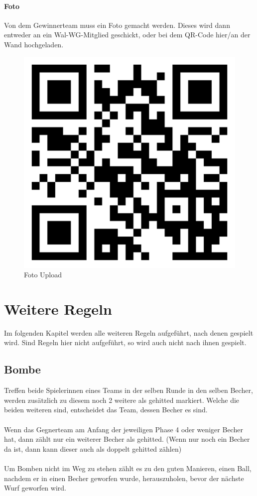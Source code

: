 \documentclass[a5paper, 12pt]{book}
\begin{document}
\subsubsection{Foto}\label{subsub:foto}
Von dem Gewinnerteam muss ein Foto gemacht werden. Dieses wird dann entweder an ein Wal-WG\texttrademark-Mitglied geschickt, oder bei dem QR-Code hier/an der Wand hochgeladen.\\ 
\begin{figure}[htbt]
    \centering
    \includegraphics[scale = 0.1]{bilder}
    \caption{Foto Upload}
    \label{fig:fotoupload}
\end{figure}
\chapter{Weitere Regeln}\label{chap:weitereregeln}
Im folgenden Kapitel werden alle weiteren Regeln aufgeführt, nach denen gespielt wird. Sind Regeln hier nicht aufgeführt, so wird auch nicht nach ihnen gespielt.
\section{Bombe}\label{sec:bombe}
Treffen beide Spielerinnen eines Teams in der selben Runde in den selben Becher, werden zusätzlich zu diesem noch 2 weitere als gehitted markiert. Welche die beiden weiteren sind, entscheidet das Team, dessen Becher es sind. \\\\
Wenn das Gegnerteam am Anfang der jeweiligen Phase 4 oder weniger Becher hat, dann zählt nur ein weiterer Becher als gehitted. (Wenn nur noch ein Becher da ist, dann kann dieser auch als doppelt gehitted zählen)\\\\
Um Bomben nicht im Weg zu stehen zählt es zu den guten Manieren, einen Ball, nachdem er in einen Becher geworfen wurde, herauszuholen, bevor der nächste Wurf geworfen wird.
\end{document}
